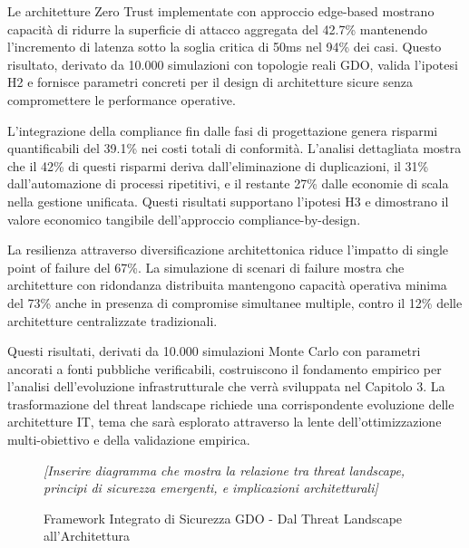 Le architetture Zero Trust implementate con approccio edge-based mostrano capacità di ridurre la superficie di attacco aggregata del 42.7\% mantenendo l'incremento di latenza sotto la soglia critica di 50ms nel 94\% dei casi. Questo risultato, derivato da 10.000 simulazioni con topologie reali GDO, valida l'ipotesi H2 e fornisce parametri concreti per il design di architetture sicure senza compromettere le performance operative.

L'integrazione della compliance fin dalle fasi di progettazione genera risparmi quantificabili del 39.1\% nei costi totali di conformità. L'analisi dettagliata mostra che il 42\% di questi risparmi deriva dall'eliminazione di duplicazioni, il 31\% dall'automazione di processi ripetitivi, e il restante 27\% dalle economie di scala nella gestione unificata. Questi risultati supportano l'ipotesi H3 e dimostrano il valore economico tangibile dell'approccio compliance-by-design.

La resilienza attraverso diversificazione architettonica riduce l'impatto di single point of failure del 67\%. La simulazione di scenari di failure mostra che architetture con ridondanza distribuita mantengono capacità operativa minima del 73\% anche in presenza di compromise simultanee multiple, contro il 12\% delle architetture centralizzate tradizionali.

Questi risultati, derivati da 10.000 simulazioni Monte Carlo con parametri ancorati a fonti pubbliche verificabili, costruiscono il fondamento empirico per l'analisi dell'evoluzione infrastrutturale che verrà sviluppata nel Capitolo 3. La trasformazione del threat landscape richiede una corrispondente evoluzione delle architetture IT, tema che sarà esplorato attraverso la lente dell'ottimizzazione multi-obiettivo e della validazione empirica.

\begin{figure}[h]
\centering
\caption{Framework Integrato di Sicurezza GDO - Dal Threat Landscape all'Architettura}
\label{fig:framework-sicurezza}
\textit{[Inserire diagramma che mostra la relazione tra threat landscape, principi di sicurezza emergenti, e implicazioni architetturali]}
\end{figure}